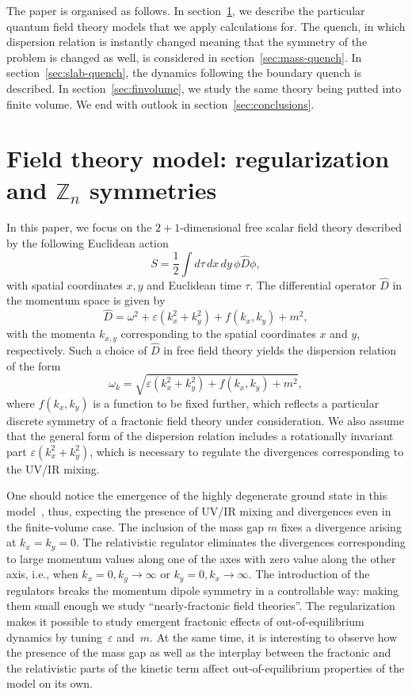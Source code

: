 \documentclass[a4paper,12pt]{article}
\newcommand{\be}{\begin{equation}}
\newcommand{\ee}{\end{equation}}
\newcommand{\eps}{\varepsilon}
\newcommand{\om}{\omega}
\newcommand{\Z}[1]{\mathbb{Z}_{#1}}
\newcommand{\secref}[1]{section~\ref{#1}}
\begin{document}
The paper is organised as follows. In \secref{sec:setup}, we describe the particular quantum field theory models that we apply calculations for. The quench, in which dispersion relation is instantly changed meaning that the symmetry of the problem is changed as well, is considered in \secref{sec:mass-quench}. In \secref{sec:slab-quench}, the dynamics following the boundary quench is described. In \secref{sec:finvolume}, we study the same theory being putted into finite volume. We end with outlook in \secref{sec:conclusions}.

\section{Field theory model: regularization and \texorpdfstring{$\Z{n}$}{Zn} symmetries}
\label{sec:setup}

In this paper, we focus on the $2 + 1$-dimensional free scalar field theory described by the following Euclidean action
\be 
    S = \frac{1}{2}\int d\tau\,dx\,dy\,\phi \hat{D} \phi,
\ee 
with spatial coordinates $x,y$ and Euclidean time $\tau$. The differential operator $\hat{D}$ in the momentum space is given by
\be 
    \hat{D} = \om^2 + \eps\left(k_x^2 + k_y^2\right) + f(k_x, k_y) + m^2,
\ee 
with the momenta $k_{x,y}$ corresponding to the spatial coordinates $x$ and $y$, respectively. Such a choice of $\hat{D}$ in free field theory yields the dispersion relation of the form
\be 
    \om_k = \sqrt{\eps\left(k_x^2 + k_y^2\right) + f(k_x, k_y) + m^2},
\ee 
where $f(k_x, k_y)$ is a function to be fixed further, which reflects a particular discrete symmetry of a fractonic field theory under consideration. We also assume that the general form of the dispersion relation includes a rotationally invariant part $\eps(k_x^2 + k_y^2)$, which is necessary to regulate the divergences corresponding to the UV/IR mixing.

One should notice the emergence of the highly degenerate ground state in this model~\cite{Seiberg:2020bhn}, thus, expecting the presence of UV/IR mixing and divergences even in the finite-volume case. The inclusion of the mass gap $m$ fixes a divergence arising at $k_x = k_y = 0$. The relativistic regulator eliminates the divergences corresponding to large momentum values along one of the axes with zero value along the other axis, i.e., when $k_x = 0, k_y \to \infty$ or $k_y = 0, k_x \to \infty$. The introduction of the regulators breaks the momentum dipole symmetry in a controllable way: making them small enough we study ``nearly-fractonic field theories''. The regularization makes it possible to study emergent fractonic effects of out-of-equilibrium dynamics by tuning~$\eps$ and~$m$. At the same time, it is interesting to observe how the presence of the mass gap as well as the interplay between the fractonic and the relativistic parts of the kinetic term affect out-of-equilibrium properties of the model on its own.
\end{document}
